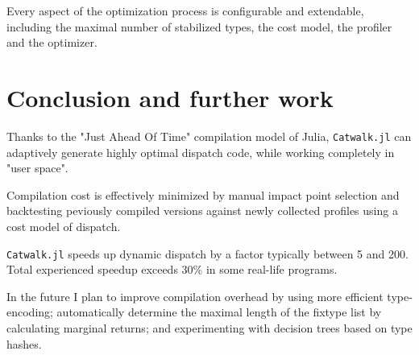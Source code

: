 \documentclass{juliacon}
\begin{document}
Every aspect of the optimization process is configurable and extendable, including the maximal number
of stabilized types, the cost model, the profiler and the optimizer.

\section {Conclusion and further work}

Thanks to the "Just Ahead Of Time" compilation model of Julia, \verb|Catwalk.jl| can adaptively generate highly optimal dispatch code, while working completely in "user space".

Compilation cost is effectively minimized by manual impact point selection and backtesting peviously compiled versions against newly collected profiles using a cost model of dispatch. 

\verb|Catwalk.jl| speeds up dynamic dispatch by a factor typically between 5 and 200. Total experienced speedup exceeds 30\% in some real-life programs.

In the future I plan to improve compilation overhead by using more efficient type-encoding;
automatically determine the maximal length of the fixtype list by calculating marginal returns; and experimenting with decision trees based on type hashes.






























\end{document}
